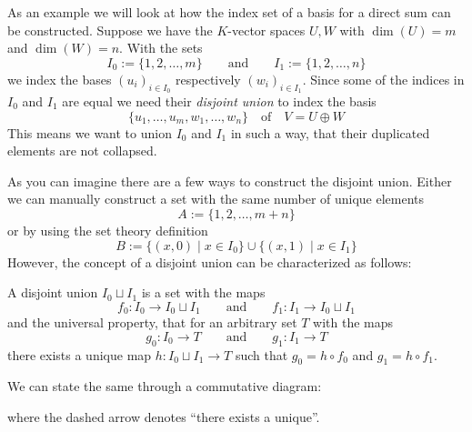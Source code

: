 As an example we will look at how the index set of a basis for a direct sum can be constructed.
Suppose we have the \(K\)-vector spaces \(U, W\) with \(\dim(U) = m\) and \(\dim(W) = n\).
With the sets
\[I_0 := \{1, 2, \ldots, m\} \qquad\text{and}\qquad I_1 := \{1, 2, \ldots, n\}\]
we index the bases \((u_i)_{i \in I_0}\) respectively \((w_i)_{i \in I_1}\).
Since some of the indices in \(I_0\) and \(I_1\) are equal we need their \emph{disjoint union} to index the basis
\[\{u_1, \ldots, u_m, w_1, \ldots, w_n\} \quad\text{of}\quad V = U \oplus W\]
This means we want to union \(I_0\) and \(I_1\) in such a way, that their duplicated elements are not collapsed.

As you can imagine there are a few ways to construct the disjoint union.
Either we can manually construct a set with the same number of unique elements
\[A := \{1, 2, \ldots, m + n\}\]
or by using the set theory definition
\[B := \{(x, 0) \mid x \in I_0\} \cup \{(x, 1) \mid x \in I_1\}\]
However, the concept of a disjoint union can be characterized as follows:

A disjoint union \(I_0 \sqcup I_1\) is a set with the maps
\[f_0: I_0 \to I_0 \sqcup I_1 \qquad\text{and}\qquad f_1: I_1 \to I_0 \sqcup I_1\]
and the universal property, that for an arbitrary set \(T\) with the maps
\[g_0: I_0 \to T\qquad\text{and}\qquad g_1: I_1 \to T\]
there exists a unique map \(h: I_0 \sqcup I_1 \to T\) such that \(g_0 = h \circ f_0\) and \(g_1 = h \circ f_1\).

We can state the same through a commutative diagram:
\begin{center}
   
\end{center}
where the dashed arrow denotes ``there exists a unique''.

